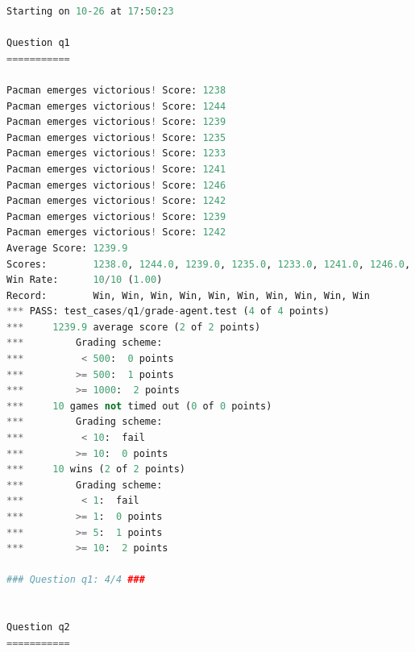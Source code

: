 \documentclass{report}
\begin{document}
        \begin{lstlisting}[language=Python, caption=Resultados del Autograder]
Starting on 10-26 at 17:50:23

Question q1
===========

Pacman emerges victorious! Score: 1238
Pacman emerges victorious! Score: 1244
Pacman emerges victorious! Score: 1239
Pacman emerges victorious! Score: 1235
Pacman emerges victorious! Score: 1233
Pacman emerges victorious! Score: 1241
Pacman emerges victorious! Score: 1246
Pacman emerges victorious! Score: 1242
Pacman emerges victorious! Score: 1239
Pacman emerges victorious! Score: 1242
Average Score: 1239.9
Scores:        1238.0, 1244.0, 1239.0, 1235.0, 1233.0, 1241.0, 1246.0, 1242.0, 1239.0, 1242.0
Win Rate:      10/10 (1.00)
Record:        Win, Win, Win, Win, Win, Win, Win, Win, Win, Win
*** PASS: test_cases/q1/grade-agent.test (4 of 4 points)
***     1239.9 average score (2 of 2 points)
***         Grading scheme:
***          < 500:  0 points
***         >= 500:  1 points
***         >= 1000:  2 points
***     10 games not timed out (0 of 0 points)
***         Grading scheme:
***          < 10:  fail
***         >= 10:  0 points
***     10 wins (2 of 2 points)
***         Grading scheme:
***          < 1:  fail
***         >= 1:  0 points
***         >= 5:  1 points
***         >= 10:  2 points

### Question q1: 4/4 ###


Question q2
===========


\end{lstlisting}
\end{document}
